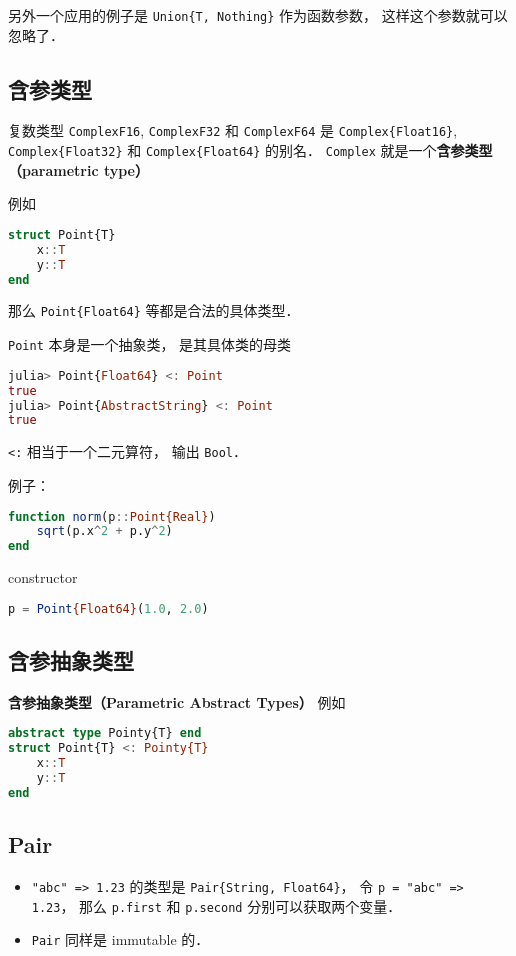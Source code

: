 另外一个应用的例子是 \verb|Union{T, Nothing}| 作为函数参数， 这样这个参数就可以忽略了．

\subsection{含参类型}

复数类型 \verb|ComplexF16|, \verb|ComplexF32| 和 \verb|ComplexF64| 是 \verb|Complex{Float16}|, \verb|Complex{Float32}| 和 \verb|Complex{Float64}| 的别名． \verb|Complex| 就是一个\textbf{含参类型（parametric type）}

例如
\begin{lstlisting}[language=julia]
struct Point{T}
    x::T
    y::T
end
\end{lstlisting}
那么 \verb|Point{Float64}| 等都是合法的具体类型．

\verb|Point| 本身是一个抽象类， 是其具体类的母类
\begin{lstlisting}[language=julia]
julia> Point{Float64} <: Point
true
julia> Point{AbstractString} <: Point
true
\end{lstlisting}
\verb|<:| 相当于一个二元算符， 输出 \verb|Bool|．

例子：
\begin{lstlisting}[language=julia]
function norm(p::Point{Real})
    sqrt(p.x^2 + p.y^2)
end
\end{lstlisting}
constructor
\begin{lstlisting}[language=julia]
p = Point{Float64}(1.0, 2.0)
\end{lstlisting}

\subsection{含参抽象类型}
\textbf{含参抽象类型（Parametric Abstract Types）}
例如
\begin{lstlisting}[language=julia]
abstract type Pointy{T} end
struct Point{T} <: Pointy{T}
    x::T
    y::T
end
\end{lstlisting}

\subsection{Pair}
\begin{itemize}
\item \verb|"abc" => 1.23| 的类型是 \verb|Pair{String, Float64}|， 令 \verb|p = "abc" => 1.23|， 那么 \verb|p.first| 和 \verb|p.second| 分别可以获取两个变量．
\item \verb|Pair| 同样是 immutable 的．
\end{itemize}


